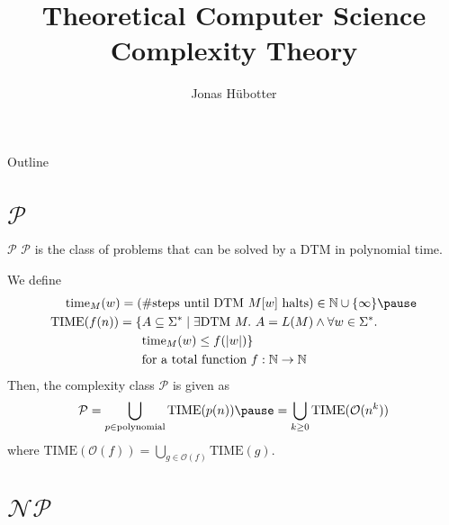 \documentclass{beamer}
\title[Theoretical Computer Science]{Theoretical Computer Science \\ Complexity Theory}
\author{Jonas Hübotter}
\date{}
\theoremstyle{definition}
\begin{document}
\begin{frame}
  \titlepage
\end{frame}

\begin{frame}[allowframebreaks]{Outline}
 \tableofcontents[subsubsectionstyle=hide]
\end{frame}

\section{$\mathcal{P}$}

\begin{frame}{$\mathcal{P}$}
    $\mathcal{P}$ is the class of problems that can be solved by a DTM in polynomial time.\pause
    \begin{definition}
        We define \begin{align*}
            \text{time}_M(w)  = (&\text{\#steps until DTM $M[w]$ halts}) \in \mathbb{N} \cup \{\infty\} \pause\\
            \text{TIME}(f(n)) = \{&A \subseteq \Sigma^* \mid \exists \text{DTM}\ M.\ A = L(M) \land \forall w \in \Sigma^*.\ \\&\text{time}_M(w) \leq f(|w|)\} \\&\text{for a total function $f : \mathbb{N} \to \mathbb{N}$}
        \end{align*}\pause
        Then, the complexity class $\mathcal{P}$ is given as \begin{align*}
            \mathcal{P} = \bigcup_{p \in \text{polynomial}} \text{TIME}(p(n)) \pause= \bigcup_{k \geq 0} \text{TIME}(\mathcal{O}(n^k))
        \end{align*} where $\text{TIME}(\mathcal{O}(f)) = \bigcup_{g \in \mathcal{O}(f)} \text{TIME}(g)$.
    \end{definition}
\end{frame}

\section{$\mathcal{NP}$}
\end{document}

